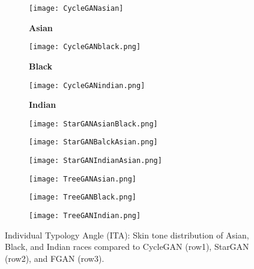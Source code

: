 {\begin{figure}
    \centering
    \begin{subfigure}[b]{0.32\linewidth}
        \centering
        \caption*{\textbf{Asian}}		         \texttt{[image: CycleGANasian]}
        \label{fig:Cycleblackita}
    \end{subfigure}
    \hfill
    \begin{subfigure}[b]{0.32\linewidth}
        \centering
        \caption*{\textbf{Black}}
        \texttt{[image: CycleGANblack.png]}
        \label{fig:Cycleasianita}
    \end{subfigure}
    \hfill
    \begin{subfigure}[b]{0.32\linewidth}
        \centering
        \caption*{\textbf{Indian}}
        \texttt{[image: CycleGANindian.png]}
        \label{fig:Cycleindianita}
    \end{subfigure}
    \centering
    \begin{subfigure}[b]{0.32\linewidth}
        \centering
        \texttt{[image: StarGANAsianBlack.png]}
        \label{fig:startganblackita}
    \end{subfigure}
    \hfill
    \begin{subfigure}[b]{0.32\linewidth}
        \centering
        \texttt{[image: StarGANBalckAsian.png]}
        \label{fig:startganasianita}
    \end{subfigure}
    \hfill
    \begin{subfigure}[b]{0.32\linewidth}
        \centering        \texttt{[image: StarGANIndianAsian.png]}
        \label{fig:startganindianita}
    \end{subfigure}
    \centering
    \begin{subfigure}[b]{0.32\linewidth}
        \centering
        \texttt{[image: TreeGANAsian.png]}
        \label{fig:treeganblackita}
    \end{subfigure}
    \hfill
    \begin{subfigure}[b]{0.32\linewidth}
        \centering
        \texttt{[image: TreeGANBlack.png]}
        \label{fig:treeganasianita}
    \end{subfigure}
    \hfill
    \begin{subfigure}[b]{0.32\linewidth}
        \centering
        \texttt{[image: TreeGANIndian.png]}
        \label{fig:treeganindianita}
    \end{subfigure}
    \caption{Individual Typology Angle (ITA): Skin tone
        distribution of Asian, Black, and Indian races compared to  CycleGAN (row1), StarGAN (row2), and FGAN (row3).    }
    \label{fig:skintoneita}
    \vspace{-.5cm}
\end{figure}

}

